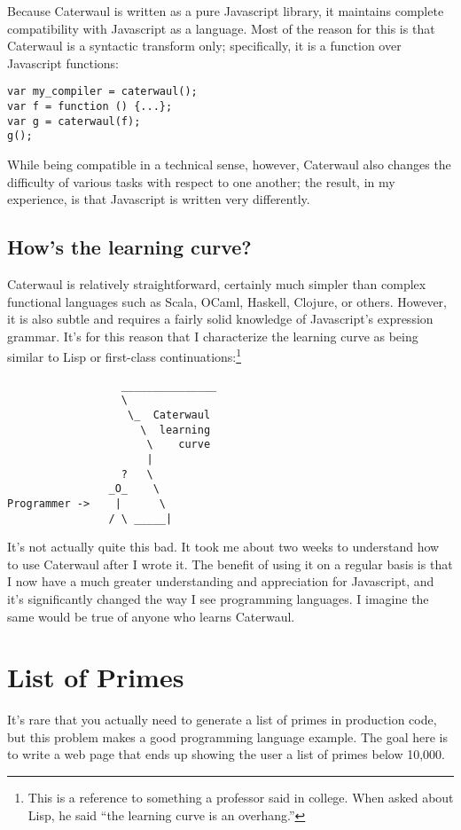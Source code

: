 \documentclass{report}
\begin{document}
  Because Caterwaul is written as a pure Javascript library, it maintains complete compatibility with Javascript as a language. Most of the reason for this is that Caterwaul is a syntactic
  transform only; specifically, it is a function over Javascript functions:

\begin{verbatim}
var my_compiler = caterwaul();
var f = function () {...};
var g = caterwaul(f);
g();
\end{verbatim}

  While being compatible in a technical sense, however, Caterwaul also changes the difficulty of various tasks with respect to one another; the result, in my experience, is that Javascript is
  written very differently.

\section{How's the learning curve?}
    Caterwaul is relatively straightforward, certainly much simpler than complex functional languages such as Scala, OCaml, Haskell, Clojure, or others. However, it is also subtle and requires
    a fairly solid knowledge of Javascript's expression grammar. It's for this reason that I characterize the learning curve as being similar to Lisp or first-class
    continuations:\footnote{This is a reference to something a professor said in college. When asked about Lisp, he said ``the learning curve is an overhang.''}

\begin{verbatim}
                  _______________
                  \
                   \_  Caterwaul
                     \  learning
                      \    curve
                      |
                  ?   \
                _O_    \
Programmer ->    |      \
                / \ _____|
\end{verbatim}

    It's not actually quite this bad. It took me about two weeks to understand how to use Caterwaul after I wrote it. The benefit of using it on a regular basis is that I now have a much
    greater understanding and appreciation for Javascript, and it's significantly changed the way I see programming languages. I imagine the same would be true of anyone who learns Caterwaul.

\chapter{List of Primes}\label{sec:list-of-primes}
  It's rare that you actually need to generate a list of primes in production code, but this problem makes a good programming language example. The goal here is to write a web page that ends
  up showing the user a list of primes below 10,000.
\end{document}
